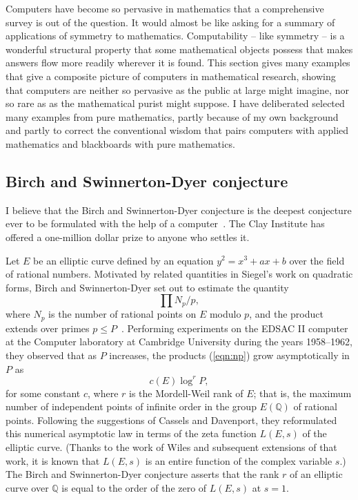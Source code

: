 \documentclass{llncs}
\newcommand{\ring}[1]{\mathbb{#1}}
\begin{document}
\bigskip

Computers have become so pervasive in mathematics that a comprehensive
survey is out of the question.  It would almost be like asking for a
summary of applications of symmetry to mathematics.  Computability --
like symmetry -- is a wonderful structural property that some
mathematical objects possess that makes answers flow more readily
wherever it is found.  This section gives many examples that give a
composite picture of computers in mathematical research, showing that
computers are neither so pervasive as the public at large might
imagine, nor so rare as as the  mathematical purist might suppose.  I
have deliberated selected many examples from pure mathematics, partly
because of my own background and partly to correct the conventional wisdom that
pairs  computers with applied mathematics and blackboards with
pure mathematics.


\subsection{Birch and Swinnerton-Dyer conjecture}

I believe that the Birch and Swinnerton-Dyer conjecture is the deepest
conjecture ever to be formulated with the help of a computer~\cite{BSD}.  The
Clay Institute has offered a one-million dollar prize to anyone who
settles it.

Let $E$  be an elliptic curve defined by
an equation $y^2 = x^3 + a x + b$ 
over the field of rational
numbers.  Motivated by related quantities in Siegel's work on quadratic forms, Birch and Swinnerton-Dyer set out to estimate the quantity
\begin{equation}\label{eqn:np}
\prod {N_p/p},
\end{equation}
where $N_p$ is the number of rational points on $E$ modulo $p$, and
the product extends over primes $p\le P$~\cite{Bir}.  Performing
experiments on the EDSAC II computer at the Computer laboratory at Cambridge University during the years 1958--1962, they observed that as $P$ increases, the products (\ref{eqn:np})
grow asymptotically in $P$ as 
\[
c(E) \log^r P,
\]
for some constant $c$, where $r$ is the Mordell-Weil rank of $E$; that
is, the maximum number of independent points of infinite order in the
group $E(\ring{Q})$ of rational points.  Following the suggestions of
Cassels and Davenport, they reformulated this numerical asymptotic law in
terms of the zeta function $L(E,s)$ of the elliptic curve.  (Thanks to the work of Wiles
and subsequent extensions of that
work, it is known that $L(E,s)$ is an entire function of the complex
variable $s$.)  The Birch and Swinnerton-Dyer conjecture asserts that
the rank $r$ of an elliptic curve over $\ring{Q}$ is equal to the
order of the zero of $L(E,s)$ at $s=1$.
\end{document}
